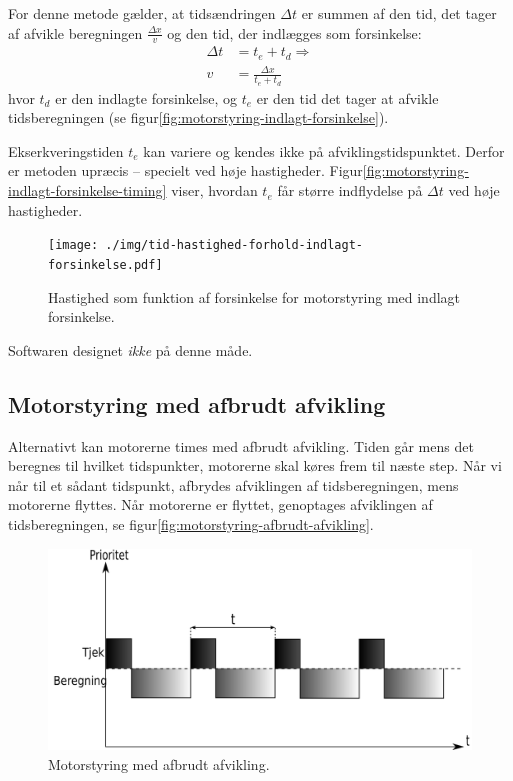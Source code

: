 For denne metode gælder, at tidsændringen $\Delta t$ er summen af den
tid, det tager af afvikle beregningen $\frac{\Delta x}v$ og den tid,
der indlægges som forsinkelse:
\begin{align}
  \Delta t &= t_e + t_d \Rightarrow \label{eq:afbrudt-afvikling-tid} \\
  v &= \frac{\Delta x}{t_e + t_d}
\end{align}
hvor $t_d$ er den indlagte forsinkelse, og $t_e$ er den tid det tager
at afvikle tidsberegningen (se figur\vref{fig:motorstyring-indlagt-forsinkelse}).

Ekserkveringstiden $t_e$ kan variere og kendes ikke på
afviklingstidspunktet. Derfor er metoden upræcis -- specielt ved høje
hastigheder. Figur\vref{fig:motorstyring-indlagt-forsinkelse-timing}
viser, hvordan $t_e$ får større indflydelse på $\Delta t$ ved høje
hastigheder.


\begin{figure}[htbp]
  \centering
  \texttt{[image: ./img/tid-hastighed-forhold-indlagt-forsinkelse.pdf]}
  \caption{Hastighed som funktion af forsinkelse for motorstyring med
    indlagt forsinkelse.}
  \label{fig:motorstyring-indlagt-forsinkelse-timing}
\end{figure}

Softwaren designet \textit{ikke} på denne måde.


\subsection{Motorstyring med afbrudt afvikling}

Alternativt kan motorerne times med afbrudt afvikling. Tiden går mens
det beregnes til hvilket tidspunkter, motorerne skal køres frem til
næste step. Når vi når til et sådant tidspunkt, afbrydes afviklingen
af tidsberegningen, mens motorerne flyttes. Når motorerne er flyttet,
genoptages afviklingen af tidsberegningen, se
figur\vref{fig:motorstyring-afbrudt-afvikling}.

\begin{figure}[htbp]
  \centering
  \includegraphics[width=.8\textwidth]{../brugere/kjaergaard/motorstyring-afbrudt-afvikling}
  \caption{Motorstyring med afbrudt afvikling.}
  \label{fig:motorstyring-afbrudt-afvikling}
\end{figure}

